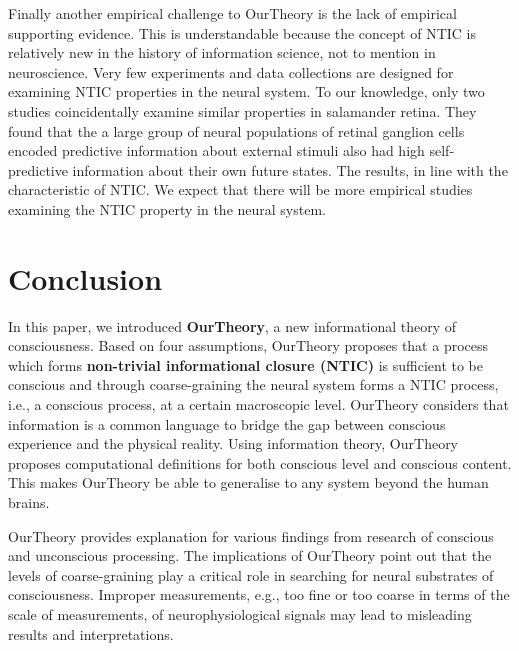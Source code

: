 \documentclass[utf8]{article}
\begin{document}
        Finally another empirical challenge to \ac{OurTheory} is the lack of empirical supporting evidence. This is understandable because the concept of NTIC is relatively new in the history of information science, not to mention in neuroscience. Very few experiments and data collections are designed for examining NTIC properties in the neural system. To our knowledge, only two studies \citep{Palmer2015, sederberg2018learning} coincidentally examine similar properties in salamander retina. They found that the a large group of neural populations of retinal ganglion cells encoded predictive information about external stimuli also had high self-predictive information about their own future states. The results, in line with the characteristic of NTIC. We expect that there will be more empirical studies examining the NTIC property in the neural system. 

    \section{Conclusion}
    In this paper, we introduced \textbf{\acf{OurTheory}}, a new informational theory of consciousness. Based on four assumptions, \ac{OurTheory} proposes that a process which forms \textbf{non-trivial informational closure (NTIC)} is sufficient to be conscious and through coarse-graining the neural system forms a NTIC process, i.e., a conscious process, at a certain macroscopic level. \ac{OurTheory} considers that information is a common language to bridge the gap between conscious experience and the physical reality. Using information theory, \ac{OurTheory} proposes computational definitions for both conscious level and conscious content. This makes \ac{OurTheory} be able to generalise to any system beyond the human brains. 
    
    \ac{OurTheory} provides explanation for various findings from research of conscious and unconscious processing. The implications of \ac{OurTheory} point out that the levels of coarse-graining play a critical role in searching for neural substrates of consciousness. Improper measurements, e.g., too fine or too coarse in terms of the scale of measurements, of neurophysiological signals may lead to misleading results and interpretations. 
    
\end{document}
